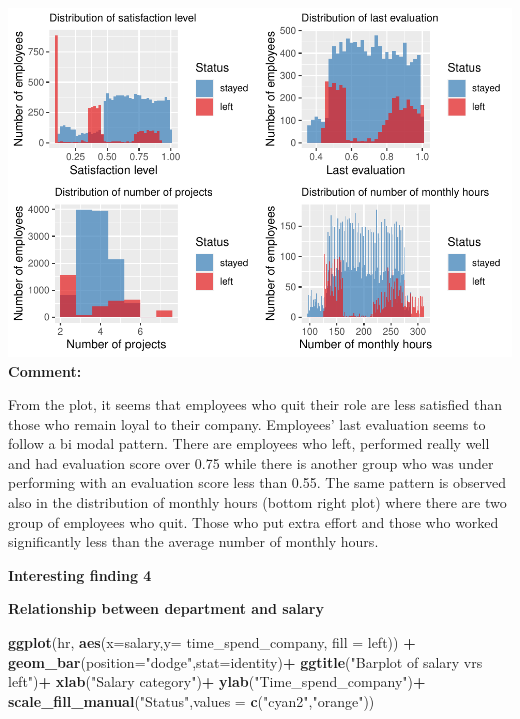 \documentclass[
  11pt,
]{article}
\newenvironment{Shaded}{\begin{snugshade}}{\end{snugshade}}
\newcommand{\AttributeTok}[1]{\textcolor[rgb]{0.13,0.29,0.53}{#1}}
\newcommand{\FunctionTok}[1]{\textcolor[rgb]{0.13,0.29,0.53}{\textbf{#1}}}
\newcommand{\NormalTok}[1]{#1}
\newcommand{\SpecialCharTok}[1]{\textcolor[rgb]{0.81,0.36,0.00}{\textbf{#1}}}
\newcommand{\StringTok}[1]{\textcolor[rgb]{0.31,0.60,0.02}{#1}}
\begin{document}
\includegraphics[width=0.9\linewidth]{OWUSU_project_files/figure-latex/unnamed-chunk-14-1}\\
\textbf{Comment:}

From the plot, it seems that employees who quit their role are less
satisfied than those who remain loyal to their company. Employees' last
evaluation seems to follow a bi modal pattern. There are employees who
left, performed really well and had evaluation score over 0.75 while
there is another group who was under performing with an evaluation score
less than 0.55. The same pattern is observed also in the distribution of
monthly hours (bottom right plot) where there are two group of employees
who quit. Those who put extra effort and those who worked significantly
less than the average number of monthly hours.

\hfill\break

\textbf{Interesting finding 4}

\textbf{Relationship between department and salary}

\begin{Shaded}
\begin{Highlighting}[]
\FunctionTok{ggplot}\NormalTok{(hr, }\FunctionTok{aes}\NormalTok{(}\AttributeTok{x=}\NormalTok{salary,}\AttributeTok{y=}\NormalTok{ time\_spend\_company, }\AttributeTok{fill  =}\NormalTok{ left)) }\SpecialCharTok{+}
  \FunctionTok{geom\_bar}\NormalTok{(}\AttributeTok{position=}\StringTok{"dodge"}\NormalTok{,}\AttributeTok{stat=}\StringTok{\textquotesingle{}identity\textquotesingle{}}\NormalTok{)}\SpecialCharTok{+}
  \FunctionTok{ggtitle}\NormalTok{(}\StringTok{"Barplot of salary vrs left"}\NormalTok{)}\SpecialCharTok{+}
  \FunctionTok{xlab}\NormalTok{(}\StringTok{"Salary category"}\NormalTok{)}\SpecialCharTok{+} \FunctionTok{ylab}\NormalTok{(}\StringTok{"Time\_spend\_company"}\NormalTok{)}\SpecialCharTok{+}
  \FunctionTok{scale\_fill\_manual}\NormalTok{(}\StringTok{"Status"}\NormalTok{,}\AttributeTok{values =} \FunctionTok{c}\NormalTok{(}\StringTok{"cyan2"}\NormalTok{,}\StringTok{"orange"}\NormalTok{))}
\end{Highlighting}
\end{Shaded}
\end{document}
